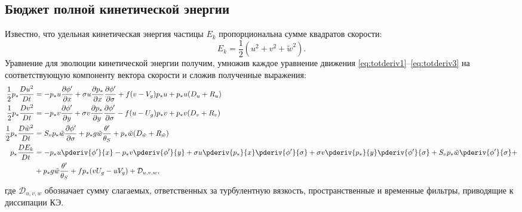 \subsection{Бюджет полной кинетической энергии}
Известно, что удельная кинетическая энергия частицы $E_k$ пропорциональна сумме квадратов скорости:
$$E_k=\frac{1}{2}\left(u^2+v^2+\tilde{w}^2\right).$$
Уравнение для эволюции кинетической энергии получим, умножив каждое уравнение движения \eqref{eq:totderiv1}--\eqref{eq:totderiv3} на соответствующую компоненту вектора скорости и сложив полученные выражения:
\begin{subequations}\label{eq:ek0}
\begin{align}
\frac{1}{2}p_*\frac{Du^2}{Dt}&=-p_*u \frac{\partial{\phi'}}{\partial{x}}+\sigma u \frac{\partial{p_*}}{\partial{x}}\frac{\partial{\phi'}}{\partial{\sigma}}+f(v-V_g )p_*u+p_*u(D_u+R_u )\label{eq:ek1} \\
\frac{1}{2}p_*\frac{Dv^2}{Dt}&=-p_*v \frac{\partial{\phi'}}{\partial{y}}+\sigma v \frac{\partial{p_*}}{\partial{y}}\frac{\partial{\phi'}}{\partial{\sigma}}-f(u-U_g )p_*v+p_*v(D_v+R_v )\label{eq:ek2} \\
\frac{1}{2}p_*\frac{D\tilde{w}^2}{Dt}&=S_vp_*\tilde{w}\frac{\partial{\phi'}}{\partial{\sigma}}+p_*g\tilde{w}\frac{\theta'}{\theta_S}+p_*\tilde{w}(D_{\tilde{w}}+R_{\tilde{w}})\label{eq:ek3} \\
p_*\frac{DE_k}{Dt}&=-p_*u \pderiv{\phi'}{x}-p_*v \pderiv{\phi'}{y}+\sigma u \pderiv{p_*}{x}\pderiv{\phi'}{\sigma}+\sigma v \pderiv{p_*}{y}\pderiv{\phi'}{\sigma}+S_vp_*\tilde{w}\pderiv{\phi'}{\sigma}+\nonumber \\ 
&+p_*g\tilde{w}\frac{\theta'}{\theta_S}+fp_*(vU_g-uV_g) + \mathcal{D}_{u,v,w}, \label{eq:ek4}
\end{align}
\end{subequations}
где $\mathcal{D}_{u,v,w}$ обозначает сумму слагаемых, ответственных за турбулентную вязкость, пространственные и временные фильтры, приводящие к диссипации КЭ.

